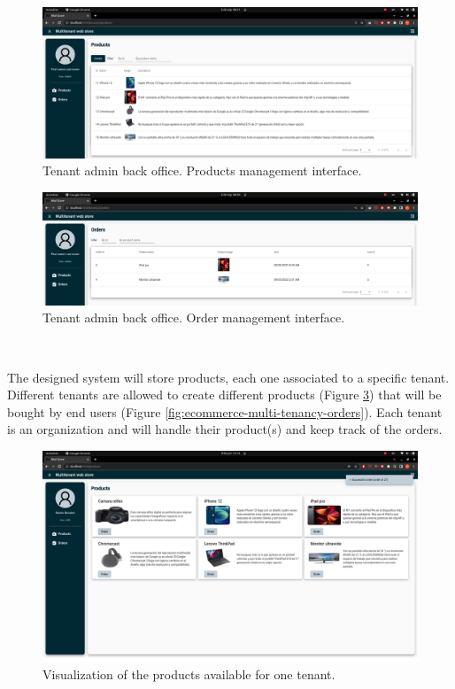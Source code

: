 \documentclass[12pt,english]{article} %
\begin{document}
\begin{figure}[H]
    \centering
    \includegraphics[scale=0.245]{img/mws/ecommerce-multi-tenancy-admin-products-management.png}
    \caption{Tenant admin back office. Products management interface.}
    \label{fig:ecommerce-multi-tenancy-admin-products}
\end{figure}

\begin{figure}[H]
    \centering
    \includegraphics[scale=0.245]{img/mws/ecommerce-multi-tenancy-admin-orders-view.png}
    \caption{Tenant admin back office. Order management interface.}
    \label{fig:ecommerce-multi-tenancy-admin-orders}
\end{figure}


\ 

The designed system will store products, each one associated to a specific tenant.
Different tenants are allowed to create different products (Figure \ref{fig:ecommerce-multi-tenancy-products}) that will be bought by end users (Figure \ref{fig:ecommerce-multi-tenancy-orders}).
Each tenant is an organization and will handle their product(s) and keep track of the orders.

\begin{figure}[H]
    \centering
    \includegraphics[scale=0.24]{img/mws/ecommerce-multi-tenancy-products.png}
    \caption{Visualization of the products available for one tenant.}
    \label{fig:ecommerce-multi-tenancy-products}
\end{figure}
\end{document}
